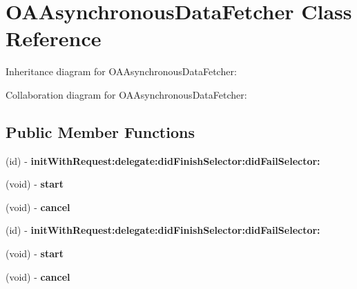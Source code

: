\hypertarget{interface_o_a_asynchronous_data_fetcher}{
\section{\-O\-A\-Asynchronous\-Data\-Fetcher \-Class \-Reference}
\label{interface_o_a_asynchronous_data_fetcher}
}


\-Inheritance diagram for \-O\-A\-Asynchronous\-Data\-Fetcher\-:


\-Collaboration diagram for \-O\-A\-Asynchronous\-Data\-Fetcher\-:
\subsection*{\-Public \-Member \-Functions}
\begin{DoxyCompactItemize}
\item 
\hypertarget{interface_o_a_asynchronous_data_fetcher_ac766d31ce49c8e2c942b200ad62d57ac}{
(id) -\/ {\bfseries init\-With\-Request\-:delegate\-:did\-Finish\-Selector\-:did\-Fail\-Selector\-:}}
\label{interface_o_a_asynchronous_data_fetcher_ac766d31ce49c8e2c942b200ad62d57ac}

\item 
\hypertarget{interface_o_a_asynchronous_data_fetcher_aa54831c11d914f5de957c82c18d18945}{
(void) -\/ {\bfseries start}}
\label{interface_o_a_asynchronous_data_fetcher_aa54831c11d914f5de957c82c18d18945}

\item 
\hypertarget{interface_o_a_asynchronous_data_fetcher_a72596f769dec2f2087d20bfdb9502c3e}{
(void) -\/ {\bfseries cancel}}
\label{interface_o_a_asynchronous_data_fetcher_a72596f769dec2f2087d20bfdb9502c3e}

\item 
\hypertarget{interface_o_a_asynchronous_data_fetcher_ac766d31ce49c8e2c942b200ad62d57ac}{
(id) -\/ {\bfseries init\-With\-Request\-:delegate\-:did\-Finish\-Selector\-:did\-Fail\-Selector\-:}}
\label{interface_o_a_asynchronous_data_fetcher_ac766d31ce49c8e2c942b200ad62d57ac}

\item 
\hypertarget{interface_o_a_asynchronous_data_fetcher_aa54831c11d914f5de957c82c18d18945}{
(void) -\/ {\bfseries start}}
\label{interface_o_a_asynchronous_data_fetcher_aa54831c11d914f5de957c82c18d18945}

\item 
\hypertarget{interface_o_a_asynchronous_data_fetcher_a72596f769dec2f2087d20bfdb9502c3e}{
(void) -\/ {\bfseries cancel}}
\label{interface_o_a_asynchronous_data_fetcher_a72596f769dec2f2087d20bfdb9502c3e}


\end{DoxyCompactItemize}
